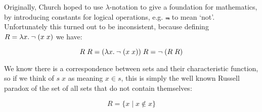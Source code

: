\begin{slide*}

\vspace*{0.5cm}


Originally, Church hoped to use $\lambda$-notation to give a foundation for
mathematics, by introducing constants for logical operations, e.g. {\red
$\Not$} to mean `not'. Unfortunately this turned out to be inconsistent,
because defining {\red $R = \lambda x.\: \neg\; (x\; x)$} we have:

{\red $$ R\; R = (\lambda x.\: \neg\; (x\; x)) \; R = \neg\; (R\; R) $$}

We know there is a correspondence between sets and their characteristic
function, so if we think of {\red $s\;x$} as meaning {\red $x \in s$}, this is
simply the well known Russell paradox of the set of all sets that do not
contain themselves:

{\red $$ R = \{x \mid x \not\in x\} $$}

\end{slide*}




